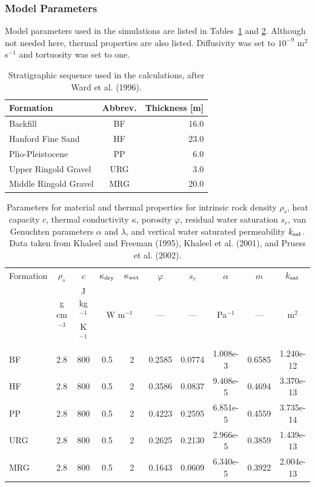 \subsubsection{Model Parameters}

Model parameters used in the simulations are listed in Tables~\ref{t1} and \ref{t2}. Although not needed here, thermal properties are also listed. Diffusivity was set to $10^{-9}$ m$^2$ s$^{-1}$ and tortuosity was set to one.

\renewcommand{\tabcolsep}{1.7mm}

\begin{table}[H]\centering
\caption{Stratigraphic sequence used in the calculations, after Ward et al. (1996).}\label{t1}

\vspace{3mm}

\begin{tabular}{lcr}
\toprule
Formation & Abbrev. & Thickness [m]\\
\midrule
Backfill & BF & 16.0\\
Hanford Fine Sand & HF & 23.0\\
Plio-Pleistocene & PP & 6.0\\
Upper Ringold Gravel & URG & 3.0\\
Middle Ringold Gravel & MRG & 20.0\\
\bottomrule
\end{tabular}
\end{table}

\begin{table}[H]\centering
\caption{Parameters for material and thermal properties for intrinsic rock density $\rho_s$, heat capacity $c$, thermal conductivity $\kappa$, porosity $\varphi$, residual water saturation $s_r$, van Genuchten parameters $\alpha$ and $\lambda$, and vertical water saturated permeability $k_{\rm sat}$. Data taken from Khaleel and Freeman (1995), Khaleel et al. (2001), and Pruess et al. (2002).}\label{t2}

\vspace{3mm}

\begin{tabular}{lccccccccc}
\toprule
Formation & $\rho_s$ & $c$ & $\kappa_{\rm dry}$ & $\kappa_{\rm wet}$ & $\varphi$ & $s_r$ & $\alpha$ & $m$ & $k_{\rm sat}$\\
& g cm$^{-3}$ & J kg$^{-1}$ K$^{-1}$ & \multicolumn{2}{c}{W m$^{-1}$} & --- & --- & Pa$^{-1}$ & --- & m$^2$\\
\midrule
BF  & 2.8 & 800 & 0.5 & 2 & 0.2585 & 0.0774 & 1.008e-3 & 0.6585  &1.240e-12\\
HF  & 2.8 & 800 & 0.5 & 2 & 0.3586 & 0.0837 & 9.408e-5 & 0.4694  &3.370e-13\\
PP  & 2.8 & 800 & 0.5 & 2 & 0.4223 & 0.2595 & 6.851e-5 & 0.4559  &3.735e-14\\
URG & 2.8 & 800 & 0.5 & 2 & 0.2625 & 0.2130 & 2.966e-5 & 0.3859  &1.439e-13\\
MRG & 2.8 & 800 & 0.5 & 2 & 0.1643 & 0.0609 & 6.340e-5 & 0.3922  &2.004e-13\\
\bottomrule
\end{tabular}
\end{table}

